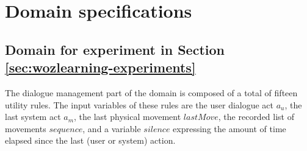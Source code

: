 
\chapter{Domain specifications}
\label{chap:domainspecs}


\section{Domain for experiment in Section \ref{sec:wozlearning-experiments}}

The dialogue management part of the domain is composed of a total of fifteen utility rules.  The input variables of these rules are the user dialogue act $a_u$, the last system act $a_m$, the last physical movement $\mathit{lastMove}$, the recorded list of movements $\mathit{sequence}$, and a variable $\mathit{silence}$ expressing the amount of time elapsed since the last (user or system) action.  

